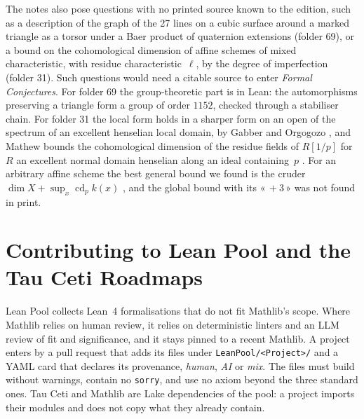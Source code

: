 \documentclass[runningheads,a4paper]{llncs}
\newcommand{\q}[1]{«\,#1\,»}
\newcommand{\lean}[1]{\texttt{#1}}
\begin{document}
The notes also pose questions with no printed source known to the edition, such as a description of the graph of the 27 lines on a cubic surface around a marked triangle as a torsor under a Baer product of quaternion extensions (folder 69), or a bound on the cohomological dimension of affine schemes of mixed characteristic, with residue characteristic~$\ell$, by the degree of imperfection (folder 31). Such questions would need a citable source to enter \emph{Formal Conjectures}. For folder 69 the group-theoretic part is in Lean: the automorphisms preserving a triangle form a group of order $1152$, checked through a stabiliser chain. For folder 31 the local form holds in a sharper form on an open of the spectrum of an excellent henselian local domain, by Gabber and Orgogozo \cite[Theorem~1.2 and §6]{gabberorgogozo2008}, and Mathew bounds the cohomological dimension of the residue fields of $R[1/p]$ for $R$ an excellent normal domain henselian along an ideal containing~$p$ \cite[Proposition~4.5]{mathew2021}. For an arbitrary affine scheme the best general bound we found is the cruder $\dim X + \sup_x \operatorname{cd}_p k(x)$ \cite[Corollary~3.29]{clausenmathew2021}, and the global bound with its \q{${}+3$} was not found in print.

\section{Contributing to Lean Pool and the Tau Ceti Roadmaps}\label{sec:leanpool}

Lean Pool \cite{leanpool} collects Lean~4 formalisations that do not fit Mathlib's scope. Where Mathlib relies on human review, it relies on deterministic linters and an LLM review of fit and significance, and it stays pinned to a recent Mathlib. A project enters by a pull request that adds its files under \texttt{LeanPool/<Project>/} and a YAML card that declares its provenance, \emph{human}, \emph{AI} or \emph{mix}. The files must build without warnings, contain no \lean{sorry}, and use no axiom beyond the three standard ones. Tau Ceti and Mathlib are Lake dependencies of the pool: a project imports their modules and does not copy what they already contain.
\end{document}
